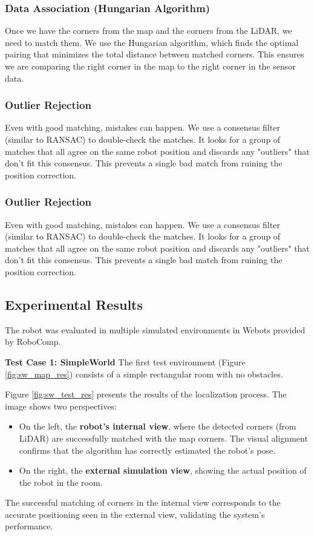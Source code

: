 \documentclass[conference]{IEEEtran}
\begin{document}
\subsubsection{Data Association (Hungarian Algorithm)}
Once we have the corners from the map and the corners from the LiDAR, we need to match them. We use the Hungarian algorithm, which finds the optimal pairing that minimizes the total distance between matched corners. This ensures we are comparing the right corner in the map to the right corner in the sensor data.

\subsubsection{Outlier Rejection}
Even with good matching, mistakes can happen. We use a consensus filter (similar to RANSAC) to double-check the matches. It looks for a group of matches that all agree on the same robot position and discards any "outliers" that don't fit this consensus. This prevents a single bad match from ruining the position correction.


\subsubsection{Outlier Rejection}
Even with good matching, mistakes can happen. We use a consensus filter (similar to RANSAC) to double-check the matches. It looks for a group of matches that all agree on the same robot position and discards any "outliers" that don't fit this consensus. This prevents a single bad match from ruining the position correction.

\subsection{Experimental Results}
The robot was evaluated in multiple simulated environments in Webots provided by RoboComp.

\textbf{Test Case 1: SimpleWorld}
The first test environment (Figure \ref{fig:sw_map_res}) consists of a simple rectangular room with no obstacles.

Figure \ref{fig:sw_test_res} presents the results of the localization process. The image shows two perspectives:
\begin{itemize}
    \item On the left, the \textbf{robot's internal view}, where the detected corners (from LiDAR) are successfully matched with the map corners. The visual alignment confirms that the algorithm has correctly estimated the robot's pose.
    \item On the right, the \textbf{external simulation view}, showing the actual position of the robot in the room.
\end{itemize}
The successful matching of corners in the internal view corresponds to the accurate positioning seen in the external view, validating the system's performance.
\end{document}
